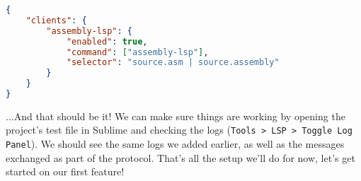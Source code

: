 \begin{lstlisting}[language=json]
{
    "clients": {
        "assembly-lsp": {
            "enabled": true,
            "command": ["assembly-lsp"],
            "selector": "source.asm | source.assembly"
        }
    }
}
\end{lstlisting}

...And that should be it! We can make sure things are working by opening the project's
test file in Sublime and checking the logs (\texttt{Tools > LSP > Toggle Log Panel}). 
We should see the same logs we added earlier, as well as the messages exchanged as
part of the protocol. That's all the setup we'll do for now, let's get started on our
first feature!








